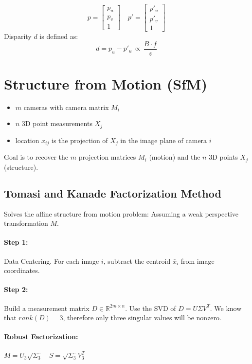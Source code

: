 \documentclass[8pt, a4paper, landscape, includeheadfoot]{extarticle}
\begin{document}
\begin{multicols*}{4}
	$$
		p = \begin{bmatrix}
			p_u \\ p_v \\ 1
		\end{bmatrix} \quad p' = \begin{bmatrix}
			p'_u \\ p'_v \\ 1
		\end{bmatrix}
	$$
	Disparity $d$ is defined as:
	$$
		d = p_u - p'_u \, \propto \,  \frac{B \cdot f}{z}
	$$

	\section{Structure from Motion (SfM)}

	\begin{itemize}[itemsep=0pt, leftmargin=8pt]
		\item $m$ cameras with camera matrix $M_i$
		\item $n$ 3D point measurements $X_j$
		\item location $x_{ij}$ is the projection of $X_j$ in the image plane of camera $i$
	\end{itemize}
	Goal is to recover the $m$ projection matrices $M_i$ (motion) and the $n$ 3D points $X_j$ (structure).

	\Umbruch

	\subsection{Tomasi and Kanade Factorization Method}
	Solves the affine structure from motion problem: Assuming a weak perspective transformation $M$.

	\paragraph{Step 1:} Data Centering. For each image $i$, subtract the centroid $\bar{x}_i$ from image coordinates.

	\paragraph{Step 2: } Build a measurement matrix $D\in\mathbb{R}^{2m \times n}$. Use the SVD of $D = U\Sigma V^T$. We know that $rank(D) = 3$, therefore only three singular values will be nonzero.

	\paragraph{Robust Factorization: } $M = U_3\sqrt{\Sigma_3} \quad S = \sqrt{\Sigma_3}V_3^T$


\end{multicols*}
\end{document}

